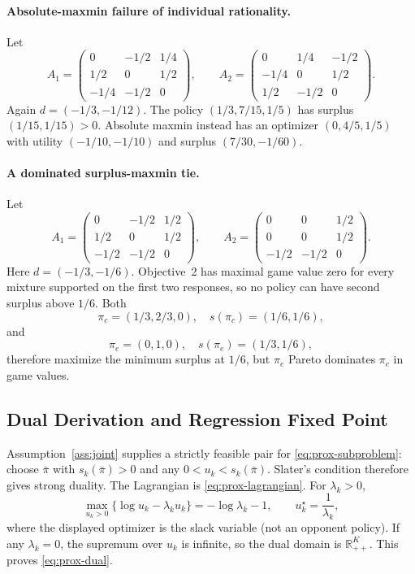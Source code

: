 \documentclass{article}
\theoremstyle{remark}
\theoremstyle{plain}
\newcommand{\R}{\mathbb{R}}
\begin{document}
\paragraph{Absolute-maxmin failure of individual rationality.}
Let
\[
A_1=
\begin{pmatrix}
0&-1/2&1/4\\
1/2&0&1/2\\
-1/4&-1/2&0
\end{pmatrix},
\qquad
A_2=
\begin{pmatrix}
0&1/4&-1/2\\
-1/4&0&1/2\\
1/2&-1/2&0
\end{pmatrix}.
\]
Again $d=(-1/3,-1/12)$. The policy $(1/3,7/15,1/5)$ has surplus $(1/15,1/15)>0$. Absolute maxmin instead has an optimizer $(0,4/5,1/5)$ with utility $(-1/10,-1/10)$ and surplus $(7/30,-1/60)$.

\paragraph{A dominated surplus-maxmin tie.}
Let
\[
A_1=
\begin{pmatrix}
0&-1/2&1/2\\
1/2&0&1/2\\
-1/2&-1/2&0
\end{pmatrix},
\qquad
A_2=
\begin{pmatrix}
0&0&1/2\\
0&0&1/2\\
-1/2&-1/2&0
\end{pmatrix}.
\]
Here $d=(-1/3,-1/6)$. Objective~2 has maximal game value zero for every mixture supported on the first two responses, so no policy can have second surplus above $1/6$. Both
\[
\pi_c=(1/3,2/3,0),
\quad s(\pi_c)=(1/6,1/6),
\]
and
\[
\pi_e=(0,1,0),
\quad s(\pi_e)=(1/3,1/6),
\]
therefore maximize the minimum surplus at $1/6$, but $\pi_e$ Pareto dominates $\pi_c$ in game values.

\subsection{Dual Derivation and Regression Fixed Point}
\label{app:regression}
Assumption~\ref{ass:joint} supplies a strictly feasible pair for \eqref{eq:prox-subproblem}: choose $\bar\pi$ with $s_k(\bar\pi)>0$ and any $0<u_k<s_k(\bar\pi)$. Slater's condition therefore gives strong duality. The Lagrangian is \eqref{eq:prox-lagrangian}. For $\lambda_k>0$,
\[
\max_{u_k>0}\{\log u_k-\lambda_ku_k\}
=-\log\lambda_k-1,
\qquad
u_k^\star=\frac1{\lambda_k},
\]
where the displayed optimizer is the slack variable (not an opponent policy). If any $\lambda_k=0$, the supremum over $u_k$ is infinite, so the dual domain is $\R_{++}^K$. This proves \eqref{eq:prox-dual}.
\end{document}
